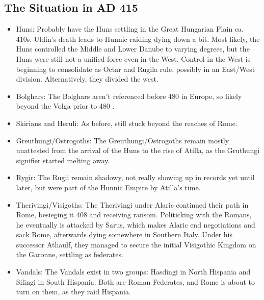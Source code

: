 \documentclass{article}
\begin{document}
	\newpage
	\subsection{The Situation in AD 415}
	\label{sec:timeline:subsec:415}
	
	\begin{itemize}
		\item Huns:\newline
		Probably have the Huns settling in the Great Hungarian Plain ca. 410s.
		Uldin's death leads to Hunnic raiding dying down a bit.
		Most likely, the Huns controlled the Middle and Lower Danube to varying degrees, but the Huns were still not a unified force even in the West.
		Control in the West is beginning to consolidate as Octar and Rugila rule, possibly in an East/West division.
		Alternatively, they divided the west.
		
		\item Bolghars:\newline
		The Bolghars aren't referenced before 480 in Europe, so likely beyond the Volga prior to 480 \cite{KimHuns}.
		
		\item Skirians and Heruli:\newline
		As before, still stuck beyond the reaches of Rome.
		
		\item Greuthungi/Ostrogoths:\newline
		The Greuthungi/Ostrogoths remain mostly unattested from the arrival of the Huns to the rise of Atilla, as the Gruthungi signifier started melting away.
		
		\item Rygir:\newline
		The Rugii remain shadowy, not really showing up in records yet until later, but were part of the Hunnic Empire by Atilla's time.
		
		\item Therivingi/Visigoths:\newline
		The Therivingi under Alaric continued their path in Rome, besieging it 408 and receiving ransom.
		Politicking with the Romans, he eventually is attacked by Sarus, which makes Alaric end negotiations and sack Rome, afterwards dying somewhere in Southern Italy.
		Under his successor Athaulf, they managed to secure the initial Visigothic Kingdom on the Garonne, settling as federates.
		
		\item Vandals:\newline
		The Vandals exist in two groups:  Hasdingi in North Hispania and Silingi in South Hispania.
		Both are Roman Federates, and Rome is about to turn on them, as they raid Hispania.
		

\end{itemize}
\end{document}
